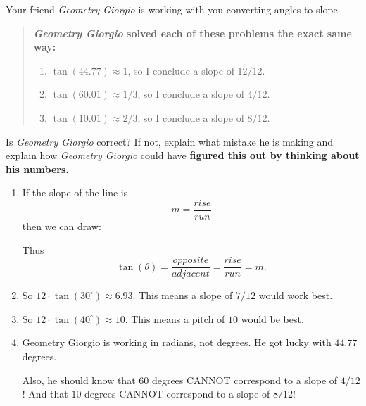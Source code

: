 \documentclass[noauthor,nooutcomes,hints,handout]{ximera}
\begin{document}
\begin{question}
 Your friend \textit{Geometry Giorgio} is working with you converting angles
  to slope.
  \begin{quote} \textbf{\textit{Geometry Giorgio} solved
      each of these problems the exact same way:}
        \begin{enumerate}
        \item $\tan(44.77) \approx 1$, so I conclude a slope of $12/12$.
        \item $\tan(60.01) \approx 1/3$, so I conclude a slope of $4/12$.
        \item $\tan(10.01) \approx 2/3$, so I conclude a slope of $8/12$.
        \end{enumerate}
  \end{quote}
  Is \textit{Geometry Giorgio} correct? If not, {explain what mistake
  he is making} and explain how \textit{Geometry Giorgio} could have
  \textbf{figured this out by thinking about his numbers.}
\begin{freeResponse}
  \begin{enumerate}
  \item If the slope of the line is
    \[
    m = \frac{rise}{run}
    \]
    then we can draw:
    \begin{center}
    \end{center}
    Thus
    \[
    \tan(\theta) =\frac{opposite}{adjacent} = \frac{rise}{run} = m.
    \]
  \item So $12\cdot \tan(30^\circ) \approx 6.93$. This means a slope
    of $7/12$ would work best.

  \item So $12\cdot \tan(40^\circ)\approx 10$. This means a pitch of
    $10$ would be best.
  \item Geometry Giorgio is working in radians, not degrees.
    He got lucky with $44.77$ degrees.

    Also, he should know that $60$ degrees CANNOT correspond to a
    slope of $4/12$! And  that $10$ degrees CANNOT correspond to a
    slope of $8/12$!
  \end{enumerate}
  \end{freeResponse}
\end{question}
\end{document}
